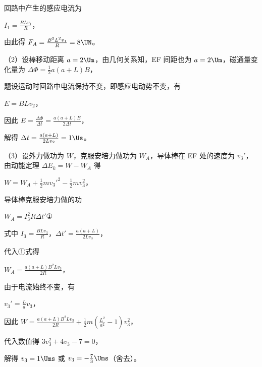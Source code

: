 \documentclass[\gkver]{gaokaozhenti}
\begin{document}
\begin{enumerate}
{回路中产生的感应电流为

$I_{1}=\frac{BLv_{1}}{R}$，

由此得 $F_{A}=\frac{B^{2}L^{2}v_{1}}{R}=8\UN$。

（2）设棒移动距离 $a = 2\Um$，由几何关系知，EF 间距也为 $a = 2\Um$，磁通量变化量为 $\Delta\Phi = \frac{1}{2}a(a + L)B$，

题设运动时回路中电流保持不变，即感应电动势不变，有

$E = BLv_{2}$，

因此 $E = \frac{\Delta\Phi}{\Delta t} = \frac{a(a + L)B}{2\Delta t}$，

解得 $\Delta t = \frac{a(a + L)}{2Lv_{2}} = 1\Us$。

（3）设外力做功为 $W$，克服安培力做功为 $W_{A}$，导体棒在 EF 处的速度为 $v_{3}'$，由动能定理 $\Delta E_{k}=W-W_{A}$ 得

$W=W_{A}+\frac{1}{2}mv_{3}'^{2}-\frac{1}{2}mv_{3}^{2}$，

导体棒克服安培力做的功

$W_{A}=I_{3}^{2}R\Delta t'$①

式中 $I_{3}=\frac{BLv_{3}}{R}$，$\Delta t'=\frac{a(a+L)}{2Lv_{3}}$，

代入①式得

$W_{A}=\frac{a(a+L)B^{2}Lv_{3}}{2R}$，

由于电流始终不变，有

$v_{3}'=\frac{L}{a}v_{3}$，

因此 $W=\frac{a(a+L)B^{2}Lv_{3}}{2R}+\frac{1}{2}m\left(\frac{L^{2}}{a^{2}}-1\right)v_{3}^{2}$，

代入数值得 $3v_{3}^{2} + 4v_{3} - 7 = 0$，

解得 $v_{3}=1\Ums$ 或 $v_{3}=-\frac{7}{3}\Ums$（舍去）。
}

\end{enumerate}
\end{document}
